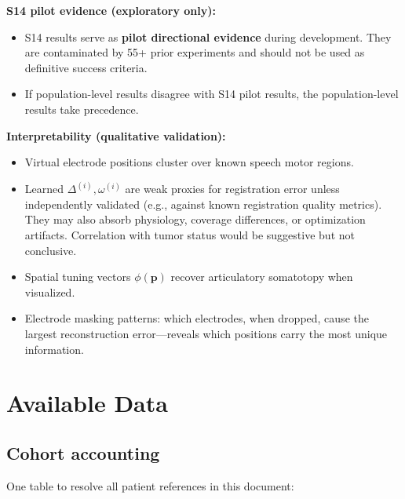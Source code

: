 \documentclass[11pt,letterpaper]{article}
\newcommand{\bfp}{\mathbf{p}}
\begin{document}
\textbf{S14 pilot evidence (exploratory only):}
\begin{itemize}[leftmargin=2em]
\item S14 results serve as \textbf{pilot directional evidence} during development. They are contaminated by 55+ prior experiments and should not be used as definitive success criteria.
\item If population-level results disagree with S14 pilot results, the population-level results take precedence.
\end{itemize}

\textbf{Interpretability (qualitative validation):}
\begin{itemize}[leftmargin=2em]
\item Virtual electrode positions cluster over known speech motor regions.
\item Learned $\Delta^{(i)}, \omega^{(i)}$ are weak proxies for registration error unless independently validated (e.g., against known registration quality metrics). They may also absorb physiology, coverage differences, or optimization artifacts. Correlation with tumor status would be suggestive but not conclusive.
\item Spatial tuning vectors $\phi(\bfp)$ recover articulatory somatotopy when visualized.
\item Electrode masking patterns: which electrodes, when dropped, cause the largest reconstruction error---reveals which positions carry the most unique information.
\end{itemize}


\section{Available Data}

\subsection{Cohort accounting}

One table to resolve all patient references in this document:
\end{document}
